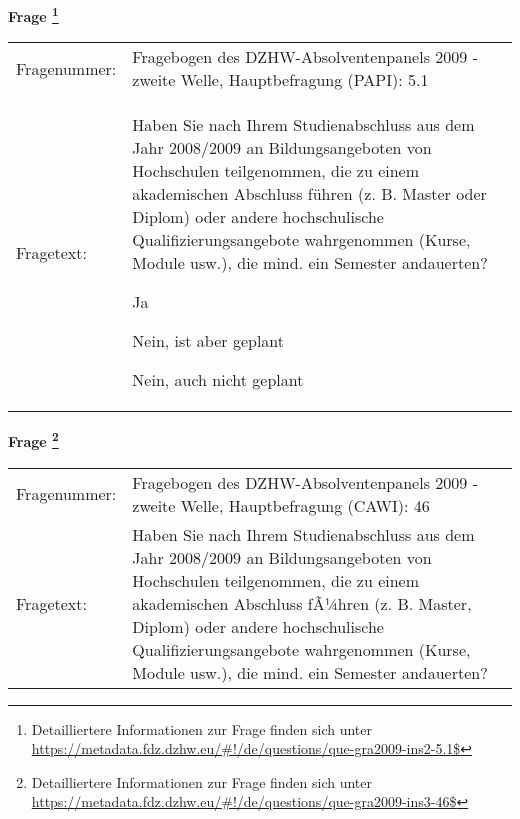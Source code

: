 				\vspace*{0.5cm}
                \noindent\textbf{Frage
	                \footnote{Detailliertere Informationen zur Frage finden sich unter
		              \url{https://metadata.fdz.dzhw.eu/\#!/de/questions/que-gra2009-ins2-5.1$}}}\\
				\begin{tabularx}{\hsize}{@{}lX}
					Fragenummer: &
					  Fragebogen des DZHW-Absolventenpanels 2009 - zweite Welle, Hauptbefragung (PAPI):
					  5.1
 \\
					Fragetext: & Haben Sie nach Ihrem Studienabschluss aus dem Jahr 2008/2009 an Bildungsangeboten von Hochschulen teilgenommen, die zu einem akademischen Abschluss führen (z. B. Master oder Diplom) oder andere hochschulische Qualifizierungsangebote wahrgenommen (Kurse, Module usw.), die mind. ein Semester andauerten?\par  Ja\par  Nein, ist aber geplant\par  Nein, auch nicht geplant \\
				\end{tabularx}
				\vspace*{0.5cm}
                \noindent\textbf{Frage
	                \footnote{Detailliertere Informationen zur Frage finden sich unter
		              \url{https://metadata.fdz.dzhw.eu/\#!/de/questions/que-gra2009-ins3-46$}}}\\
				\begin{tabularx}{\hsize}{@{}lX}
					Fragenummer: &
					  Fragebogen des DZHW-Absolventenpanels 2009 - zweite Welle, Hauptbefragung (CAWI):
					  46
 \\
					Fragetext: & Haben Sie nach Ihrem Studienabschluss aus dem Jahr 2008/2009 an Bildungsangeboten von Hochschulen teilgenommen, die zu einem akademischen Abschluss fÃ¼hren (z. B. Master, Diplom) oder andere hochschulische Qualifizierungsangebote wahrgenommen (Kurse, Module usw.), die mind. ein Semester andauerten? \\
				\end{tabularx}





